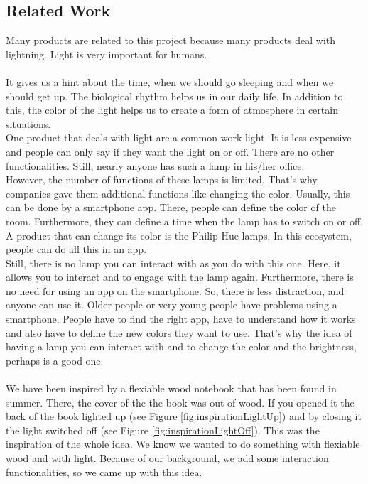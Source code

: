 \documentclass[04_projectProcess.tex]{subfiles}
\begin{document}
    \subsection{Related Work}
        \begin{flushleft}
            Many products are related to this project because many products deal with lightning.
            Light is very important for humans.\\~\\
            It gives us a hint about the time, when we should go sleeping and when we should get up. The 
            biological rhythm helps us in our daily life. In addition to this, the color of the light helps
            us to create a form of atmosphere in certain situations.\\
            
            One product that deals with light are a common work light. It is less expensive and people can only 
            say if they want the light on or off. There are no other functionalities. Still, nearly anyone has 
            such a lamp in his/her office. \\

            However, the number of functions of these lamps is limited. That's why companies gave them 
            additional functions like changing the color. Usually, this can be done by a smartphone app. 
            There, people can define the color of the room. Furthermore, they can define a time when the lamp 
            has to switch on or off. A product that can change its color is the Philip Hue lamps. In this 
            ecosystem, people can do all this in an app.  \\ 

            Still, there is no lamp you can interact with as you do with this one. Here, it allows you to interact
            and to engage with the lamp again. Furthermore, there is no need for 
            using an app on the smartphone. So, there is less distraction, and anyone can use it. Older people
            or very young people have problems using a smartphone. People have to find the right app, have to
            understand how it works and also have to define the new colors they want to use. That's why 
            the idea of having a lamp you can interact with and to change the color and the brightness, perhaps 
            is a good one. \\~\\

            We have been inspired by a flexiable wood notebook that has been found in summer. There, the cover of 
            the the book was out of wood. If you opened it the back of the book lighted up (see Figure 
            \ref{fig:inspirationLightUp}) and by closing it the light switched off (see Figure \ref{fig:inspirationLightOff}). 
            This was the inspiration of the whole idea. We know we wanted to do something 
            with flexiable wood and with light. Because of our background, we add some interaction functionalities,
            so we came up with this idea.


\end{flushleft}
\end{document}
